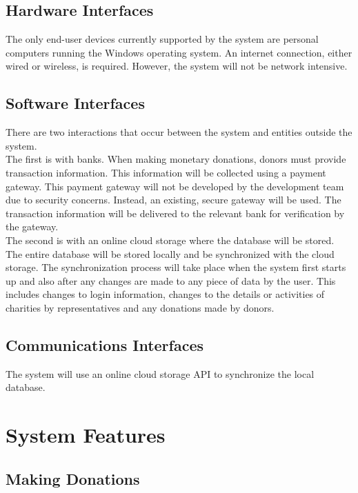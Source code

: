 \documentclass{scrreprt}
\begin{document}
\section{Hardware Interfaces}

The only end-user devices currently supported by the system are personal computers running the Windows operating system. An internet connection, either wired or wireless, is required. However, the system will not be network intensive.\\

\section{Software Interfaces}

There are two interactions that occur between the system and entities outside the system.\\

The first is with banks. When making monetary donations, donors must provide transaction information. This information will be collected using a payment gateway. This payment gateway will not be developed by the development team due to security concerns. Instead, an existing, secure gateway will be used. The transaction information will be delivered to the relevant bank for verification by the gateway.\\

The second is with an online cloud storage where the database will be stored. The entire database will be stored locally and be synchronized with the cloud storage. The synchronization process will take place when the system first starts up and also after any changes are made to any piece of data by the user. This includes changes to login information, changes to the details or activities of charities by representatives and any donations made by donors.\\

\section{Communications Interfaces}

The system will use an online cloud storage API to synchronize the local database.

\chapter{System Features}

\section{Making Donations}
\end{document}
